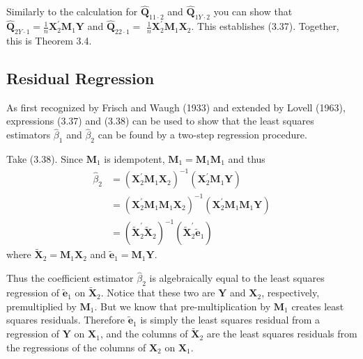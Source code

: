 \documentclass[10pt]{article}
\begin{document}
Similarly to the calculation for $\widehat{\boldsymbol{Q}}_{11 \cdot 2}$ and $\widehat{\boldsymbol{Q}}_{1 Y \cdot 2}$ you can show that $\widehat{\boldsymbol{Q}}_{2 Y \cdot 1}=\frac{1}{n} \boldsymbol{X}_{2}^{\prime} \boldsymbol{M}_{1} \boldsymbol{Y}$ and $\widehat{\boldsymbol{Q}}_{22 \cdot 1}=$ $\frac{1}{n} \boldsymbol{X}_{2}^{\prime} \boldsymbol{M}_{1} \boldsymbol{X}_{2}$. This establishes (3.37). Together, this is Theorem 3.4.

\subsection{Residual Regression}
As first recognized by Frisch and Waugh (1933) and extended by Lovell (1963), expressions (3.37) and (3.38) can be used to show that the least squares estimators $\widehat{\beta}_{1}$ and $\widehat{\beta}_{2}$ can be found by a two-step regression procedure.

Take (3.38). Since $\boldsymbol{M}_{1}$ is idempotent, $\boldsymbol{M}_{1}=\boldsymbol{M}_{1} \boldsymbol{M}_{1}$ and thus
$$
\begin{aligned}
\widehat{\beta}_{2} &=\left(\boldsymbol{X}_{2}^{\prime} \boldsymbol{M}_{1} \boldsymbol{X}_{2}\right)^{-1}\left(\boldsymbol{X}_{2}^{\prime} \boldsymbol{M}_{1} \boldsymbol{Y}\right) \\
&=\left(\boldsymbol{X}_{2}^{\prime} \boldsymbol{M}_{1} \boldsymbol{M}_{1} \boldsymbol{X}_{2}\right)^{-1}\left(\boldsymbol{X}_{2}^{\prime} \boldsymbol{M}_{1} \boldsymbol{M}_{1} \boldsymbol{Y}\right) \\
&=\left(\widetilde{\boldsymbol{X}}_{2}^{\prime} \widetilde{\boldsymbol{X}}_{2}\right)^{-1}\left(\widetilde{\boldsymbol{X}}_{2}^{\prime} \widetilde{\boldsymbol{e}}_{1}\right)
\end{aligned}
$$
where $\widetilde{\boldsymbol{X}}_{2}=\boldsymbol{M}_{1} \boldsymbol{X}_{2}$ and $\widetilde{\boldsymbol{e}}_{1}=\boldsymbol{M}_{1} \boldsymbol{Y}$.

Thus the coefficient estimator $\widehat{\beta}_{2}$ is algebraically equal to the least squares regression of $\widetilde{\boldsymbol{e}}_{1}$ on $\widetilde{\boldsymbol{X}}_{2}$. Notice that these two are $\boldsymbol{Y}$ and $\boldsymbol{X}_{2}$, respectively, premultiplied by $\boldsymbol{M}_{1}$. But we know that pre-multiplication by $\boldsymbol{M}_{1}$ creates least squares residuals. Therefore $\widetilde{\boldsymbol{e}}_{1}$ is simply the least squares residual from a regression of $\boldsymbol{Y}$ on $\boldsymbol{X}_{1}$, and the columns of $\widetilde{\boldsymbol{X}}_{2}$ are the least squares residuals from the regressions of the columns of $\boldsymbol{X}_{2}$ on $\boldsymbol{X}_{1}$.
\end{document}
